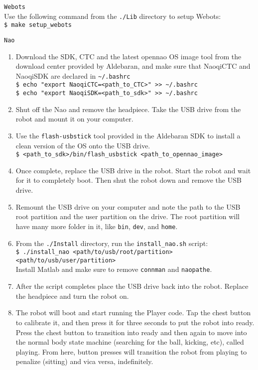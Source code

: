 \documentclass{article}
\begin{document}
  \begin{description}
    \item \texttt{Webots} \\
      Use the following command from the \texttt{./Lib} directory to setup Webots: \\
      \texttt{\$ make setup\_webots}
    \item \texttt{Nao} \\
      \begin{enumerate}
        \item Download the SDK, CTC and the latest opennao OS image tool from the download center provided by Aldebaran, and make sure that NaoqiCTC and NaoqiSDK are declared in \texttt{\textasciitilde /.bashrc}\\
        \texttt{\$ echo "export NaoqiCTC=<path\_to\_CTC>" >> \textasciitilde/.bashrc}\\
        \texttt{\$ echo "export NaoqiSDK=<path\_to\_sdk>" >> \textasciitilde/.bashrc}
        \item Shut off the Nao and remove the headpiece. Take the USB drive from the robot and mount it on your computer.
        \item Use the \texttt{flash-usbstick} tool provided in the Aldebaran SDK to install a clean version of the OS onto the USB drive.\\
        \texttt{\$ <path\_to\_sdk>/bin/flash\_usbstick <path\_to\_opennao\_image>}
        \item Once complete, replace the USB drive in the robot. Start the robot and wait for it to completely boot. Then shut the robot down and remove the USB drive.
        \item Remount the USB drive on your computer and note the path to the USB root partition and the user partition on the drive.  The root partition will have many more folder in it, like \texttt{bin}, \texttt{dev}, and \texttt{home}. 
        \item From the \texttt{./Install} directory, run the \texttt{install\_nao.sh} script: \\
          \texttt{\$ ./install\_nao <path/to/usb/root/partition> <path/to/usb/user/partition>}\\
        Install Matlab and make sure to remove \texttt{connman} and \texttt{naopathe}.  
        \item After the script completes place the USB drive back into the robot. Replace the headpiece and turn the robot on.
        \item The robot will boot and start running the Player code. Tap the chest button to calibrate it, and then press it for three seconds to put the robot into ready.  Press the chest button to transition into ready and then again to move into the normal body state machine (searching for the ball, kicking, etc), called playing. From here, button presses will transition the robot from playing to penalize (sitting) and vica versa, indefinitely.
      \end{enumerate}
  \end{description}
\end{document}
